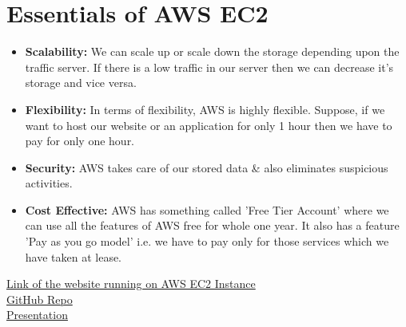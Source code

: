 \documentclass[12pt]{article}
\begin{document}
\section{Essentials of AWS EC2}
\begin{itemize}
\item \textbf{Scalability:} We can scale up or scale down the storage depending upon the traffic server. If there is a low traffic in our server then we can decrease it's storage and vice versa.\cite{varia2014overview}
\item \textbf{Flexibility:} In terms of flexibility, AWS is highly flexible. Suppose, if we want to host our website or an application for only 1 hour then we have to pay for only one hour.\cite{mishra2017amazon}
\item \textbf{Security:} AWS takes care of our stored data \& also eliminates suspicious activities.\cite{mathew2014overview}
\item \textbf{Cost Effective:} AWS has something called 'Free Tier Account' where we can use all the features of AWS free for whole one year. It also has a feature 'Pay as you go model' i.e. we have to pay only for those services which we have taken at lease.\cite{wittig2018amazon}
\end{itemize}

\href{http://13.233.117.54/}{Link of the website running on AWS EC2 Instance}\\

\href{https://github.com/rishavpandey160999/AWS-EC2-WEBSITE-HOSTING}{GitHub Repo}\\

\href{https://youtu.be/Y5yV4eJSVmc}{Presentation}



\clearpage


\end{document}
